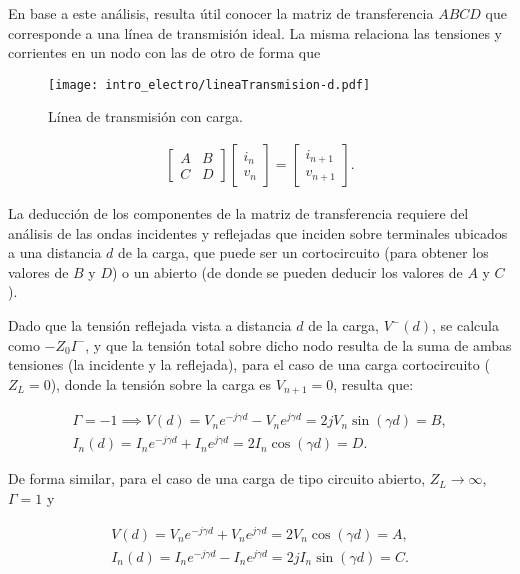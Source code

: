 En base a este análisis, resulta útil conocer la matriz de transferencia $ABCD$ que corresponde a una línea de transmisión ideal. La misma relaciona las tensiones y corrientes en un nodo con las de otro de forma que

\begin{figure}[htp]
	\centering
	\texttt{[image: intro\_electro/lineaTransmision-d.pdf]}
	\caption{Línea de transmisión con carga.}
	\label{fig:Zin-Gamma-funcionDistancia-TL}
\end{figure}

\begin{align}
\begin{bmatrix}
A & B \\
C & D
\end{bmatrix}
\begin{bmatrix}
i_n \\
v_n
\end{bmatrix}
=
\begin{bmatrix}
i_{n+1} \\
v_{n+1}
\end{bmatrix}.
\end{align}

La deducción de los componentes de la matriz de transferencia requiere del análisis de las ondas incidentes y reflejadas que inciden sobre terminales ubicados a una distancia $d$ de la carga, que puede ser un cortocircuito (para obtener los valores de $B$ y $D$) o un abierto (de donde se pueden deducir los valores de $A$ y $C$).

Dado que la tensión reflejada vista a distancia $d$ de la carga, $V^{-}(d)$, se calcula como $-Z_0 I^{-}$, y que la tensión total sobre dicho nodo resulta de la suma de ambas tensiones (la incidente y la reflejada), para el caso de una carga cortocircuito ($Z_L = 0$), donde la tensión sobre la carga es $V_{n+1} = 0$, resulta que:

\begin{align}
	\Gamma = -1 \implies V(d) = V_n e^{-j\gamma d} - V_n e^{j\gamma d} = 2 j V_n \sin(\gamma d) = B, \\
	I_n (d) = I_n e^{-j\gamma d} + I_n e^{j\gamma d} = 2 I_n \cos(\gamma d) = D.
\end{align}

De forma similar, para el caso de una carga de tipo circuito abierto, $Z_L \rightarrow \infty$, $\Gamma = 1$ y

\begin{align}
V(d) = V_n e^{-j\gamma d} + V_n e^{j\gamma d} = 2 V_n \cos(\gamma d) = A, \\
I_n (d) = I_n e^{-j\gamma d} - I_n e^{j\gamma d} = 2 j I_n \sin(\gamma d) = C.
\end{align}

